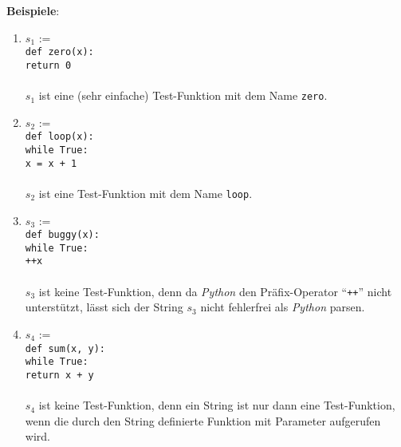 \noindent
\textbf{Beispiele}:  
\begin{enumerate}
\item $s_1$ := 
     \texttt{}        \\
     \hspace*{0.8cm} \texttt{def zero(x):} \\
     \hspace*{1.65cm} \texttt{return 0}        \\
     \hspace*{0.8cm} \texttt{}        \\[0.2cm]
      $s_1$ ist eine (sehr einfache) Test-Funktion mit dem Name \texttt{zero}.
\item $s_2$ := 
     \texttt{}        \\
     \hspace*{0.8cm}  \texttt{def loop(x):} \\
     \hspace*{1.65cm} \texttt{while True:}        \\
     \hspace*{2.5cm}  \texttt{x = x + 1}        \\
     \hspace*{0.8cm}  \texttt{}        \\[0.2cm]
      $s_2$ ist eine Test-Funktion mit dem Name \texttt{loop}.
\item $s_3$ := 
     \texttt{}        \\
     \hspace*{0.8cm}  \texttt{def buggy(x):} \\
     \hspace*{1.65cm} \texttt{while True:}        \\
     \hspace*{2.5cm}  \texttt{++x}        \\
     \hspace*{0.8cm}  \texttt{}        \\[0.2cm]
      $s_3$ ist keine Test-Funktion, denn da \textsl{Python} den Präfix-Operator
      ``\texttt{++}'' nicht unterstützt, lässt sich der String $s_3$  nicht fehlerfrei als \textsl{Python} 
      parsen.
\item $s_4$ := 
     \texttt{}        \\
     \hspace*{0.8cm}  \texttt{def sum(x, y):} \\
     \hspace*{1.65cm} \texttt{while True:}        \\
     \hspace*{2.5cm}  \texttt{return x + y}        \\
     \hspace*{0.8cm}  \texttt{}        \\[0.2cm]
      $s_4$ ist keine Test-Funktion, denn ein String ist nur dann eine Test-Funktion, wenn die durch den String
      definierte Funktion mit  Parameter aufgerufen wird.
\end{enumerate}
